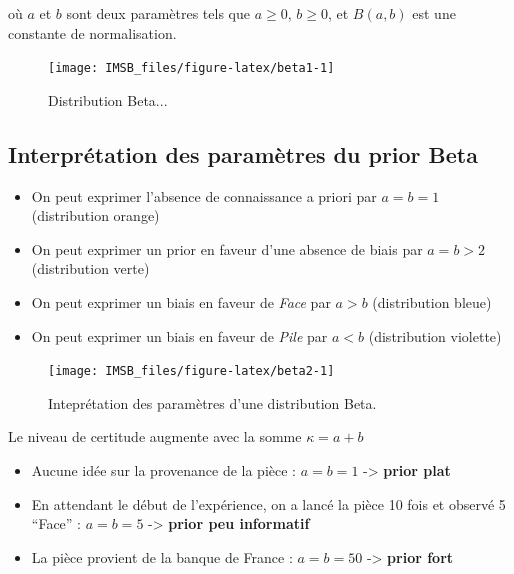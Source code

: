 \documentclass[
  a4paper,11pt,twoside,onecolumn,openright,final,oldfontcommands]{memoir}
\providecommand{\tightlist}{%
  \setlength{\itemsep}{0pt}\setlength{\parskip}{0pt}}
\theoremstyle{definition}
\theoremstyle{definition}
\theoremstyle{definition}
\theoremstyle{definition}
\theoremstyle{remark}
\begin{document}
où \(a\) et \(b\) sont deux paramètres tels que \(a \geq 0\), \(b \geq 0\), et \(B(a, b)\) est une constante de normalisation.

\begin{figure}[!htb]

{\centering \texttt{[image: IMSB\_files/figure-latex/beta1-1]} 

}

\caption{Distribution Beta...}\label{fig:beta1}
\end{figure}

\hypertarget{interpruxe9tation-des-paramuxe8tres-du-prior-beta}{%
\subsection{Interprétation des paramètres du prior Beta}\label{interpruxe9tation-des-paramuxe8tres-du-prior-beta}}

\begin{itemize}
\tightlist
\item
  On peut exprimer l'absence de connaissance a priori par \(a = b = 1\) (distribution orange)
\item
  On peut exprimer un prior en faveur d'une absence de biais par \(a = b > 2\) (distribution verte)
\item
  On peut exprimer un biais en faveur de \emph{Face} par \(a > b\) (distribution bleue)
\item
  On peut exprimer un biais en faveur de \emph{Pile} par \(a < b\) (distribution violette)
\end{itemize}

\begin{figure}[!htb]

{\centering \texttt{[image: IMSB\_files/figure-latex/beta2-1]} 

}

\caption{Inteprétation des paramètres d'une distribution Beta.}\label{fig:beta2}
\end{figure}

Le niveau de certitude augmente avec la somme \(\kappa = a + b\)

\begin{itemize}
\tightlist
\item
  Aucune idée sur la provenance de la pièce : \(a = b = 1\) -\textgreater{} \textbf{prior plat}
\item
  En attendant le début de l'expérience, on a lancé la pièce 10 fois et observé 5 ``Face'' : \(a = b = 5\) -\textgreater{} \textbf{prior peu informatif}
\item
  La pièce provient de la banque de France : \(a = b = 50\) -\textgreater{} \textbf{prior fort}
\end{itemize}
\end{document}
